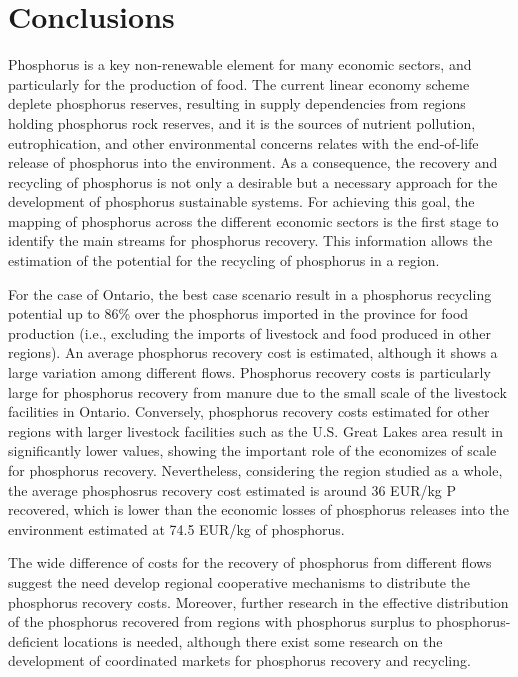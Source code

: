 \documentclass[authoryear]{elsarticle}
\begin{document}
\section{Conclusions}
Phosphorus is a key non-renewable element for many economic sectors, and particularly for the production of food. The current linear economy scheme deplete phosphorus reserves, resulting in supply dependencies from regions holding phosphorus rock reserves, and it is the sources of nutrient pollution, eutrophication, and other environmental concerns relates with the end-of-life release of phosphorus into the environment. As a consequence, the recovery and recycling of phosphorus is not only a desirable but a necessary approach for the development of phosphorus sustainable systems. For achieving this goal, the mapping of phosphorus across the different economic sectors is the first stage to identify the main streams for phosphorus recovery. This information allows the estimation of the potential for the recycling of phosphorus in a region.

For the case of Ontario, the best case scenario result in a phosphorus recycling potential up to 86\% over the phosphorus imported in the province for food production (i.e., excluding the imports of livestock and food produced in other regions). An average phosphorus recovery cost is estimated, although it shows a large variation among different flows. Phosphorus recovery costs is particularly large for phosphorus recovery from manure due to the small scale of the livestock facilities in Ontario. Conversely, phosphorus recovery costs estimated for other regions with larger livestock facilities such as the U.S. Great Lakes area result in significantly lower values, showing the important role of the economizes of scale for phosphorus recovery. Nevertheless, considering the region studied as a whole, the average phosphosrus recovery cost estimated is around 36 EUR/kg P recovered, which is lower than the economic losses of phosphorus releases into the environment estimated at 74.5 EUR/kg of phosphorus.

The wide difference of costs for the recovery of phosphorus from different flows suggest the need develop regional cooperative mechanisms to distribute the phosphorus recovery costs. Moreover, further research in the effective distribution of the phosphorus recovered from regions with phosphorus surplus to phosphorus-deficient locations is needed, although there exist some research on the development of coordinated markets for phosphorus recovery and recycling.
\end{document}
